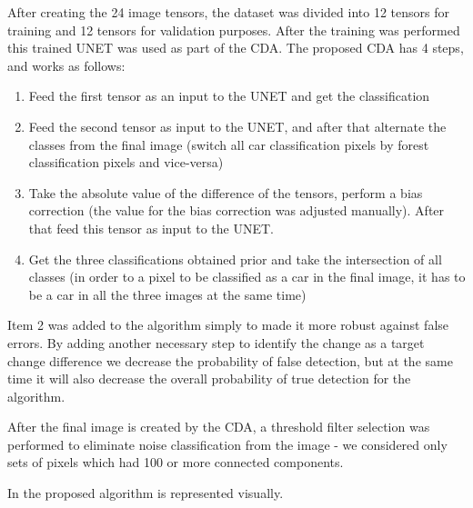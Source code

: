 After creating the 24 image tensors, the dataset was divided into 12 tensors for training and 12 tensors for validation purposes. 
After the training was performed this trained UNET was used as part of the CDA.
The proposed CDA has 4 steps, and works as follows:
\begin{enumerate}
    \item Feed the first tensor as an input to the UNET and get the classification
    \item Feed the second tensor as input to the UNET, and after that alternate the classes from the final image (switch all car classification pixels by forest classification pixels and vice-versa)
    \item Take the absolute value of the difference of the tensors, perform a bias correction (the value for the bias correction was adjusted manually). After that feed this tensor as input to the UNET.
    \item Get the three classifications obtained prior and take the intersection of all classes (in order to a pixel to be classified as a car in the final image, it has to be a car in all the three images at the same time)
\end{enumerate}

Item 2 was added to the algorithm simply to made it more robust against false errors. By adding another necessary step to identify the change as a target change difference
we decrease the probability of false detection, but at the same time it will also decrease the overall probability of true detection for the algorithm. 

After the final image is created by the CDA, a threshold filter selection was performed to eliminate noise classification from the image - we considered only sets of pixels which had 100 or more connected components.

In  the proposed algorithm is represented visually.

